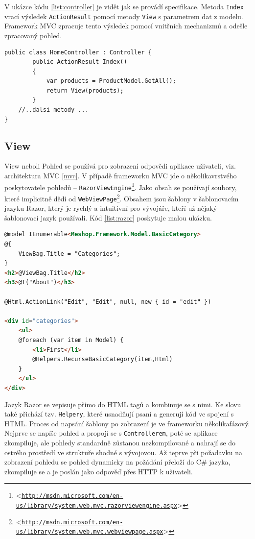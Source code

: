 \documentclass[11pt,twoside,a4paper]{book}
\let\oldUrl\url
\renewcommand\url[1]{<\texttt{\oldUrl{#1}}>}
\begin{document}
V ukázce kódu \ref{list:controller} je vidět jak se provádí specifikace. Metoda \texttt{Index} vrací výsledek \texttt{ActionResult} pomocí metody \texttt{View} s parametrem dat z modelu. Framework MVC zpracuje tento výsledek pomocí vnitřních mechanizmů a odešle zpracovaný pohled. 

\begin{lstlisting}[float=h!,language=CSharp, caption={Controller}, label=list:controller]
public class HomeController : Controller {  
        public ActionResult Index()
        {
            var products = ProductModel.GetAll();
            return View(products);
        }
	//..dalsi metody ...        
}
\end{lstlisting}

\subsection{View}
\label{sec:views}
View neboli \textsf{Pohled} se používá pro zobrazení odpovědi aplikace uživateli, viz. architektura MVC \ref{mvc}. V případě frameworku MVC jde o několikavrstvého poskytovatele pohledů -- \texttt{RazorViewEngine}\footnote{\url{http://msdn.microsoft.com/en-us/library/system.web.mvc.razorviewengine.aspx}}. Jako obsah se používají soubory, které implicitně dědí od \texttt{WebViewPage}\footnote{\url{http://msdn.microsoft.com/en-us/library/system.web.mvc.webviewpage.aspx}}. Obsahem jsou šablony v šablonovacím jazyku \textsf{Razor}, který je rychlý a intuitivní pro vývojáře, kteří už nějaký šablonovací jazyk používali. Kód \ref{list:razor} poskytuje malou ukázku. 

\begin{lstlisting}[float,language=HTML, caption={Pohled s jazykem Razor}, label=list:razor]
@model IEnumerable<Meshop.Framework.Model.BasicCategory>
@{
    ViewBag.Title = "Categories";
}
<h2>@ViewBag.Title</h2>
<h3>@T("About")</h3>

@Html.ActionLink("Edit", "Edit", null, new { id = "edit" })

<div id="categories">
	<ul>
	@foreach (var item in Model) {
		<li>First</li>
    	@Helpers.RecurseBasicCategory(item,Html)          
	}
	</ul>
</div>
\end{lstlisting}

Jazyk \textsf{Razor} se vepisuje přímo do HTML tagů a kombinuje se s nimi. Ke slovu také přichází tzv. \texttt{Helpery}, které usnadňují psaní a generují kód ve spojení s HTML. Proces od napsání šablony po zobrazení je ve frameworku několikafázový. Nejprve se napíše pohled a propojí se s \texttt{Controllerem}, poté se aplikace zkompiluje, ale pohledy standardně zůstanou nezkompilované a nahrají se do ostrého prostředí ve struktuře shodné s vývojovou. Až teprve při požadavku na zobrazení pohledu se pohled dynamicky na požádání přeloží do C\# jazyka, zkompiluje se a je poslán jako odpověď přes HTTP k uživateli. 
\end{document}
